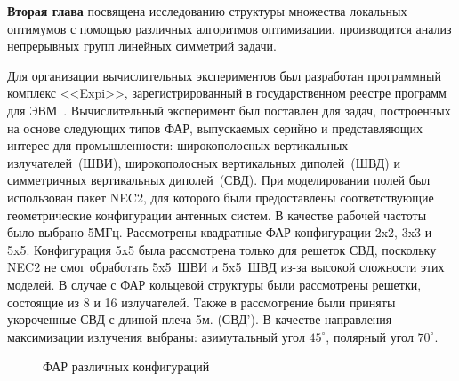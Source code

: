 {\textbf{Вторая глава}} посвящена исследованию структуры множества локальных оптимумов с помощью различных алгоритмов оптимизации,
производится анализ непрерывных групп линейных симметрий задачи.


Для организации вычислительных экспериментов был разработан программный комплекс <<Expi>>, зарегистрированный в государственном реестре программ для ЭВМ~\cite{expi}.
Вычислительный эксперимент был поставлен для задач, построенных на основе следующих типов ФАР, выпускаемых серийно и представляющих интерес для промышленности: широкополосных вертикальных излучателей~(ШВИ), широкополосных вертикальных диполей~(ШВД) и симметричных вертикальных диполей~(СВД). При моделировании полей был использован пакет NEC2, для которого были предоставлены соответствующие геометрические конфигурации антенных систем. В качестве рабочей частоты было выбрано 5МГц. Рассмотрены квадратные ФАР конфигурации 2x2, 3x3 и 5x5. Конфигурация 5x5 была рассмотрена только для решеток СВД, поскольку NEC2 не смог обработать 5x5~ШВИ и 5x5~ШВД из-за высокой сложности этих моделей. В случае с ФАР кольцевой структуры были рассмотрены решетки, состоящие из 8 и 16 излучателей. Также в рассмотрение были приняты укороченные СВД с длиной плеча 5м. (СВД'). В качестве направления максимизации излучения выбраны: азимутальный угол $45^{\circ}$, полярный угол $70^{\circ}$.

\begin{figure}
    \begin{minipage}[h]{0.49\linewidth}
    \end{minipage}
    \hfill
    \begin{minipage}[h]{0.49\linewidth}
    \end{minipage}
    \begin{minipage}[h]{0.49\linewidth}
    \end{minipage}
    \hfill
    \begin{minipage}[h]{0.49\linewidth}
    \end{minipage}
    \caption{ФАР различных конфигураций}
    \label{ris:paas_0}
\end{figure}


